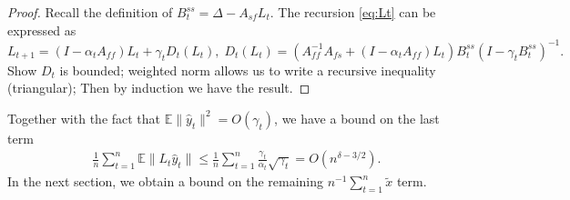 \begin{proof}
    Recall the definition of $B_t^{ss} = \Delta - A_{sf} L_t$.
    The recursion \eqref{eq:Lt} can be expressed as
    \begin{equation}
        L_{t+1} = (I - \alpha_t A_{ff}) L_t + \gamma_t D_t (L_t) , \;
        D_t (L_t) = \left(A_{ff}^{-1} A_{fs} + (I - \alpha_t A_{ff}) L_t \right)B_t^{ss} \left(I - \gamma_t B_t^{ss}\right)^{-1} .
    \end{equation}    
    {\color{red}Show $D_t$ is bounded; weighted norm allows us to write a recursive inequality (triangular); Then by induction we have the result.}
\end{proof}
Together with the fact that $\mathbb{E}\lVert \hat{y}_t \rVert^2 = O(\gamma_t)$, we have a bound on the last term
\begin{align*}
    \frac{1}{n}\sum_{t=1}^n \mathbb{E}\lVert L_t \hat{y}_t \rVert \leq \frac{1}{n} \sum_{t=1}^n \frac{\gamma_t}{\alpha_t} \sqrt{\gamma_t} = O\left(n^{\delta - 3/2}\right) .
\end{align*}
In the next section, we obtain a bound on the remaining $n^{-1} \sum_{t=1}^n \tilde{x}$ term.


